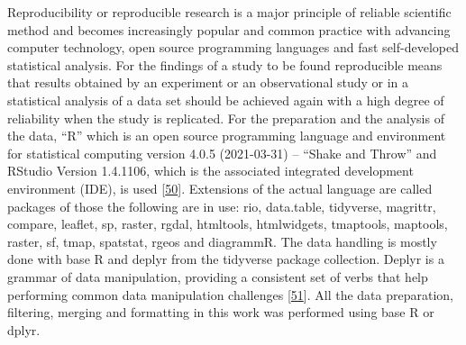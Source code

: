 \documentclass[a4paper,11pt]{article}
\begin{document}
Reproducibility or reproducible research is a major principle of reliable scientific method and becomes increasingly popular and common practice with advancing computer technology, open source programming languages and fast self-developed statistical analysis. For the findings of a study to be found reproducible means that results obtained by an experiment or an observational study or in a statistical analysis of a data set should be achieved again with a high degree of reliability when the study is replicated. For the preparation and the analysis of the data, ``R'' which is an open source programming language and environment for statistical computing version 4.0.5 (2021-03-31) -- ``Shake and Throw'' and RStudio Version 1.4.1106, which is the associated integrated development environment (IDE), is used {[}\protect\hyperlink{ref-R}{50}{]}. Extensions of the actual language are called packages of those the following are in use: rio, data.table, tidyverse, magrittr, compare, leaflet, sp, raster, rgdal, htmltools, htmlwidgets, tmaptools, maptools, raster, sf, tmap, spatstat, rgeos and diagrammR. The data handling is mostly done with base R and deplyr from the tidyverse package collection. Deplyr is a grammar of data manipulation, providing a consistent set of verbs that help performing common data manipulation challenges {[}\protect\hyperlink{ref-HadleyWickham.2021}{51}{]}. All the data preparation, filtering, merging and formatting in this work was performed using base R or dplyr.
\end{document}
